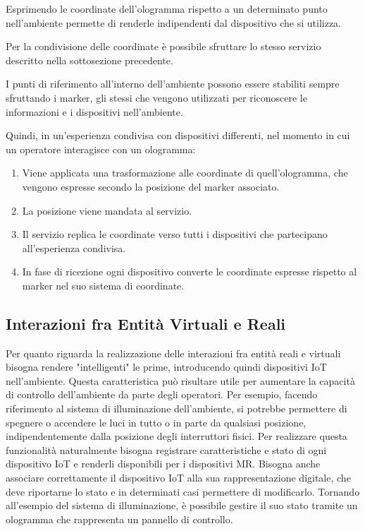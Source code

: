 Esprimendo le coordinate dell'ologramma rispetto a un determinato punto nell'ambiente permette di renderle indipendenti dal dispositivo che si utilizza.

Per la condivisione delle coordinate è possibile sfruttare lo stesso servizio descritto nella sottosezione precedente.

I punti di riferimento all'interno dell'ambiente possono essere stabiliti sempre sfruttando i marker, gli stessi che vengono utilizzati per riconoscere le informazioni e i dispositivi nell'ambiente.

Quindi, in un'esperienza condivisa con dispositivi differenti, nel momento in cui un operatore interagisce con un ologramma:
\begin{enumerate}
    \item Viene applicata una trasformazione alle coordinate di quell'ologramma, che vengono espresse secondo la posizione del marker associato.
    \item La posizione viene mandata al servizio.
    \item Il servizio replica le coordinate verso tutti i dispositivi che partecipano all'esperienza condivisa.
    \item In fase di ricezione ogni dispositivo converte le coordinate espresse rispetto al marker nel suo sistema di coordinate.
\end{enumerate}

\subsection{Interazioni fra Entità Virtuali e Reali}
Per quanto riguarda la realizzazione delle interazioni fra entità reali e virtuali bisogna rendere "intelligenti" le prime, introducendo quindi dispositivi IoT nell'ambiente.
Questa caratteristica può risultare utile per aumentare la capacità di controllo dell'ambiente da parte degli operatori.
Per esempio, facendo riferimento al sistema di illuminazione dell'ambiente, si potrebbe permettere di spegnere o accendere le luci in tutto o in parte da qualsiasi posizione, indipendentemente dalla posizione degli interruttori fisici.
Per realizzare questa funzionalità naturalmente bisogna registrare caratteristiche e stato di ogni dispositivo IoT e renderli disponibili per i dispositivi MR.
Bisogna anche associare correttamente il dispositivo IoT alla sua rappresentazione digitale, che deve riportarne lo stato e in determinati casi permettere di modificarlo.
Tornando all'esempio del sistema di illuminazione, è possibile gestire il suo stato tramite un ologramma che rappresenta un pannello di controllo.

